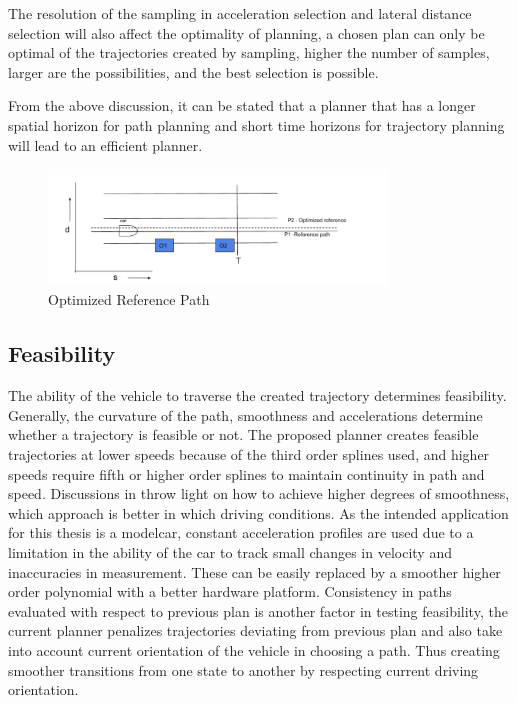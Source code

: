 The resolution of the sampling in acceleration selection and lateral distance selection will also affect the optimality of planning, a chosen plan can only be optimal of the trajectories created by sampling, higher the number of samples, larger are the possibilities, and the best selection is possible. 

From the above discussion, it can be stated that a planner that has a longer spatial horizon for path planning and short time horizons for trajectory planning will lead to an efficient planner. 
 
 \begin{figure}[h]
    \centering
    \includegraphics[width=0.8\textwidth]{Images/optimized_reference.png}
    \caption{Optimized Reference Path}
    \label{optimized_reference}
\end{figure}

\subsection{Feasibility}
\label{feasibility}
The ability of the vehicle to traverse the created trajectory determines feasibility. Generally, the curvature of the path, smoothness and accelerations determine whether a trajectory is feasible or not. The proposed planner creates feasible trajectories at lower speeds because of the third order splines used, and higher speeds require fifth or higher order splines to maintain continuity in path and speed. Discussions in \cite{cmu_parallel_thesis} \cite{ppt_teqniqs_coll_Avdnce} throw light on how to achieve higher degrees of smoothness, which approach is better in which driving conditions. As the intended application for this thesis is a modelcar, constant acceleration profiles are used due to a limitation in the ability of the car to track small changes in velocity and inaccuracies in measurement. These can be easily replaced by a smoother higher order polynomial with a better hardware platform. Consistency in paths evaluated with respect to previous plan is another factor in testing feasibility, the current planner penalizes trajectories deviating from previous plan and also take into account current orientation of the vehicle in choosing a path. Thus creating smoother transitions from one state to another by respecting current driving orientation. 

